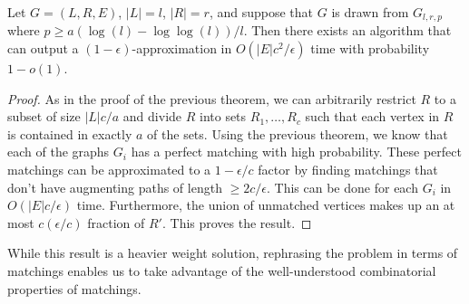 \begin{thm}
Let $G=(L,R,E)$, $|L|=l$, $|R|=r$, and suppose that $G$ is drawn from $G_{l,r,p}$ where $p \geq a(\log(l)-\log\log(l))/l$. Then there exists an algorithm that can output a $(1-\epsilon)$-approximation in $O(|E|c^2/\epsilon)$ time with probability $1-o(1)$.
\end{thm}
\begin{proof}
As in the proof of the previous theorem, we can arbitrarily restrict $R$ to a
subset of size $|L|c/a$ and divide $R$ into sets $R_1,\ldots,R_c$ such that each
vertex in $R$ is contained in exactly $a$ of the sets. Using the previous
theorem, we know that each of the graphs $G_i$ has a perfect matching with high
probability. These perfect matchings can be approximated to a $1-\epsilon/c$
factor by finding matchings that don't have augmenting paths of length
$\geq 2c/\epsilon$. This can be done for each $G_i$ in $O(|E|c/\epsilon)$ time.
Furthermore, the union of unmatched vertices makes up an at most
$c(\epsilon/c)$ fraction of $R'$. This proves the result. 
\end{proof}

While this result is a heavier weight solution, rephrasing the problem in terms
of matchings enables us to take advantage of the well-understood combinatorial
properties of matchings.
